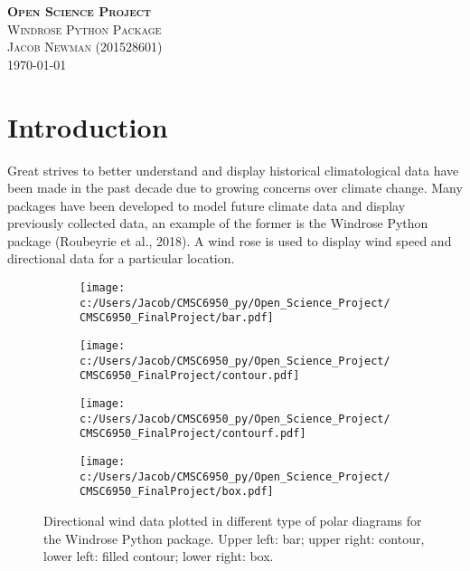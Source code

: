 \documentclass{article}
\begin{document}
\begin{titlepage}
\newcommand{\HRule}{\rule{\linewidth}{0.5mm}}

\center
\textsc{\LARGE \textbf{Open Science Project}}\\[1 cm]

\textsc{\Large Windrose Python Package}\\[0.5 cm]

\textsc{\large Jacob Newman (201528601)}\\[0.5 cm]





\vfill\vfill\vfill
{\large\today}
\vfill

\end{titlepage}


\section{Introduction}\label{Introduction}
Great strives to better understand and display historical climatological data have been made in the past decade due to growing concerns over climate change. Many packages have been developed to model 
future climate data and display previously collected data, an example of the former is the Windrose Python package (Roubeyrie et al., 2018). A wind rose is used to display wind speed and directional data 
for a particular location.  

\begin{figure}[h!]
\begin{subfigure}{.55\textwidth}
\centering
\texttt{[image: c:/Users/Jacob/CMSC6950\_py/Open\_Science\_Project/CMSC6950\_FinalProject/bar.pdf]}
\label{bar_windrose}
\end{subfigure}
\begin{subfigure}{.55\textwidth}
\centering
\texttt{[image: c:/Users/Jacob/CMSC6950\_py/Open\_Science\_Project/CMSC6950\_FinalProject/contour.pdf]}
\label{contour}
\end{subfigure}
\begin{subfigure}{.55\textwidth}
\centering
\texttt{[image: c:/Users/Jacob/CMSC6950\_py/Open\_Science\_Project/CMSC6950\_FinalProject/contourf.pdf]}
\label{contourf_windrose}
\end{subfigure}
\begin{subfigure}{.55\textwidth}
\centering
\texttt{[image: c:/Users/Jacob/CMSC6950\_py/Open\_Science\_Project/CMSC6950\_FinalProject/box.pdf]}
\label{box_windrose}
\end{subfigure}
\label{windrose_diagrams}
\caption{Directional wind data plotted in different type of polar diagrams for the Windrose Python package. 
Upper left: bar; upper right: contour, lower left: filled contour; lower right: box.}
\end{figure}
\end{document}
